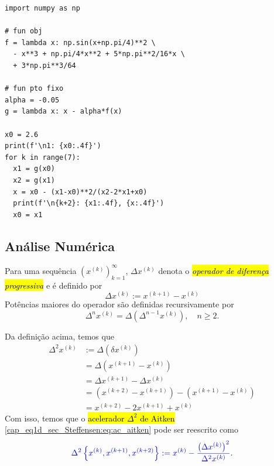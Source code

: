 \begin{ex}
\begin{lstlisting}
import numpy as np

# fun obj
f = lambda x: np.sin(x+np.pi/4)**2 \
  - x**3 + np.pi/4*x**2 + 5*np.pi**2/16*x \
  + 3*np.pi**3/64

# fun pto fixo
alpha = -0.05
g = lambda x: x - alpha*f(x)

x0 = 2.6
print(f'\n1: {x0:.4f}')
for k in range(7):
  x1 = g(x0)
  x2 = g(x1)
  x = x0 - (x1-x0)**2/(x2-2*x1+x0)
  print(f'\n{k+2}: {x1:.4f}, {x:.4f}')
  x0 = x1
\end{lstlisting}

\end{ex}

\subsection{Análise Numérica}

\begin{defn}
  Para uma sequência $\left(x^{(k)}\right)_{k=1}^\infty$, $\Delta x^{(k)}$ denota o \hl{\emph{operador de diferença progressiva}} e é definido por
  \begin{equation}
    \Delta x^{(k)} := x^{(k+1)} - x^{(k)}
  \end{equation}
  Potências maiores do operador são definidas recursivamente por
  \begin{equation}
    \Delta^n x^{(k)} = \Delta\left(\Delta^{n-1}x^{(k)}\right),\quad n\geq 2.
  \end{equation}
\end{defn}

Da definição acima, temos que
\begin{align}
  \Delta^2 x^{(k)} &:= \Delta\left(\delta x^{(k)}\right)\\
                   &= \Delta\left(x^{(k+1)} - x^{(k)}\right)\\
                   &= \Delta x^{(k+1)} - \Delta x^{(k)}\\
                   &= \left(x^{(k+2)} - x^{(k+1)}\right) - \left(x^{(k+1)} - x^{(k)}\right)\\
                   &= x^{(k+2)} - 2x^{(k+1)} + x^{(k)}
\end{align}
Com isso, temos que o \hl{acelerador $\Delta^2$ de Aitken} \eqref{cap_eq1d_sec_Steffensen:eq:ac_aitken} pode ser reescrito como
\begin{equation}
  {\color{blue}\Delta^2\left\{x^{(k)}, x^{(k+1)}, x^{(k+2)}\right\} := x^{(k)} - \frac{\left(\Delta x^{(k)}\right)^2}{\Delta^2 x^{(k)}}}.
\end{equation}

